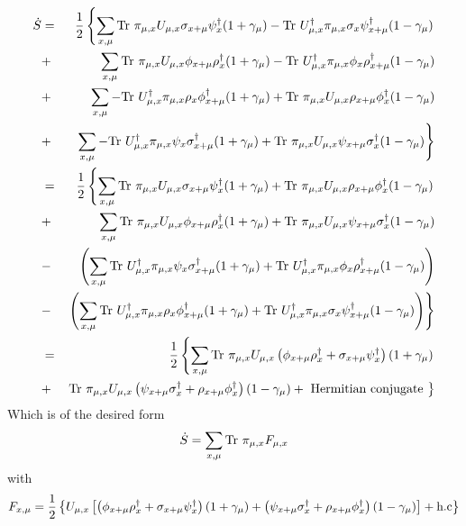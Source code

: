 \documentclass[12pt]{article}
\begin{document}
\begin{eqnarray} 
\Sdot &=& \frac{1}{2} \left\{ \sum_{x,\mu} \Tr \pi_{\mu,x} U_{\mu,x}  \sigma_{x+\mu} \psidag_{x}  \onepgm  - \Tr  \Udag_{\mu, x} \pi_{\mu, x} \sigma_{x} \psidag_{x+\mu} \onemgm \right. \nonumber \\
&+&  \sum_{x,\mu} \Tr  \pi_{\mu,x} U_{\mu,x}  \phi_{x+\mu} \rhodag_{x}  \onepgm - \Tr \Udag_{\mu, x} \pi_{\mu, x} \phi_{x} \rhodag_{x+\mu} \onemgm  \nonumber \\
&+&  \sum_{x,\mu} - \Tr \Udag_{\mu, x}  \pi_{\mu, x} \rho_{x} \phidag_{x+\mu} \onepgm  + \Tr \pi_{\mu,x} U_{\mu,x} \rho_{x+\mu} \phidag_x \onemgm  \nonumber \\
&+& \left. \sum_{x,\mu} - \Tr \Udag_{\mu, x} \pi_{\mu, x} \psi_{x} \sigmadag_{x+\mu} \onepgm  + \Tr  \pi_{\mu,x} U_{\mu,x} \psi_{x+\mu} \sigmadag_x \onemgm \right\} \\
%
  &=& \frac{1}{2} \left\{ \sum_{x,\mu} \Tr \pi_{\mu,x} U_{\mu,x}  \sigma_{x+\mu} \psidag_{x}  \onepgm   + \Tr \pi_{\mu,x} U_{\mu,x} \rho_{x+\mu} \phidag_x \onemgm   \nonumber \right. \\
&+&  \sum_{x,\mu} \Tr  \pi_{\mu,x} U_{\mu,x}  \phi_{x+\mu} \rhodag_{x}  \onepgm   + \Tr  \pi_{\mu,x} U_{\mu,x} \psi_{x+\mu} \sigmadag_x \onemgm \nonumber \\
&-& \left(\sum_{x,\mu} \Tr \Udag_{\mu, x} \pi_{\mu, x} \psi_{x} \sigmadag_{x+\mu} \onepgm  + \Tr \Udag_{\mu, x} \pi_{\mu, x} \phi_{x} \rhodag_{x+\mu} \onemgm \right) \nonumber \\
&-& \left. \left( \sum_{x,\mu} \Tr \Udag_{\mu, x}  \pi_{\mu, x} \rho_{x} \phidag_{x+\mu} \onepgm + \Tr  \Udag_{\mu, x} \pi_{\mu, x} \sigma_{x} \psidag_{x+\mu} \onemgm \right) \right\} \\
%
&=&  \frac{1}{2} \left\{ \sum_{x,\mu} \Tr \pi_{\mu,x} U_{\mu,x} \left( \phi_{x+\mu} \rhodag_{x} + \sigma_{x+\mu} \psidag_{x} \right)  \onepgm   \nonumber \right. \\
& + & \left. \Tr \pi_{\mu,x} U_{\mu,x} \left( \psi_{x+\mu} \sigmadag_x + \rho_{x+\mu} \phidag_x \right) \onemgm  +  \mbox{ Hermitian conjugate } \right\} 
\end{eqnarray}
Which is of the desired form
\begin{equation}
\dot{S} = \sum_{x,\mu} \mbox{Tr}\  \pi_{\mu,x} F_{\mu,x}
\end{equation} 
with
\begin{equation}
F_{x,\mu} =\frac{1}{2} \left\{ U_{\mu,x} \left[ \left( \phi_{x+\mu} \rho^{\dagger}_{x} + \sigma_{x+\mu} \psi^{\dagger}_{x} \right)  (1 + \gamma_{\mu}) +  \left( \psi_{x+\mu} \sigma^{\dagger}_x + \rho_{x+\mu} \phi^{\dagger}_x \right) (1 - \gamma_{\mu}) \right] + \mbox{h.c} \right\}
\end{equation}
\end{document}
